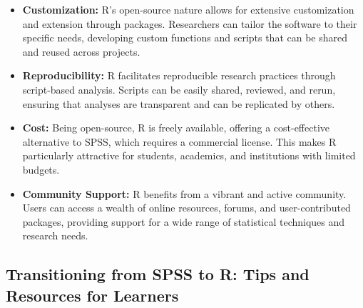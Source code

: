 \documentclass[
]{book}
\begin{document}
\begin{itemize}
\item
  \textbf{Customization:} R's open-source nature allows for extensive customization and extension through packages. Researchers can tailor the software to their specific needs, developing custom functions and scripts that can be shared and reused across projects.
\item
  \textbf{Reproducibility:} R facilitates reproducible research practices through script-based analysis. Scripts can be easily shared, reviewed, and rerun, ensuring that analyses are transparent and can be replicated by others.
\item
  \textbf{Cost:} Being open-source, R is freely available, offering a cost-effective alternative to SPSS, which requires a commercial license. This makes R particularly attractive for students, academics, and institutions with limited budgets.
\item
  \textbf{Community Support:} R benefits from a vibrant and active community. Users can access a wealth of online resources, forums, and user-contributed packages, providing support for a wide range of statistical techniques and research needs.
\end{itemize}

\hypertarget{transitioning-from-spss-to-r-tips-and-resources-for-learners}{%
\subsection*{Transitioning from SPSS to R: Tips and Resources for Learners}\label{transitioning-from-spss-to-r-tips-and-resources-for-learners}}
\end{document}
